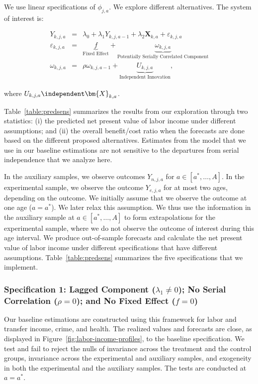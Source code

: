 We use linear specifications of $\phi_{j,a}$. We explore different alternatives. The system of interest is:

\begin{eqnarray}
Y_{k,j,a}                   &=& \lambda_{0} + \lambda_{1} Y_{k,j,a-1} + \lambda_{2}  \bm{X}_{k,a} + \varepsilon_{k,j,a} \nonumber \\
\varepsilon_{k,j,a} &=& \underbrace{f}_{\text{Fixed Effect}} + \underbrace{\omega_{k,j,a}}_{\text{Potentially Serially Correlated Component}} \nonumber \\
\omega_{k,j,a}      &=& \rho \omega_{k,j,a-1} + \underbrace{U_{k,j,a}}_{\text{Independent Innovation}},
\end{eqnarray}

\noindent where $U_{k,j,a} \independent \bm{X}_{k,a}$.

Table~\ref{table:predsens} summarizes the results from our exploration through two statistics: (i) the predicted net present value of labor income under different assumptions; and (ii) the overall benefit/cost ratio when the forecasts are done based on the different proposed alternatives. Estimates from the model that we use in our baseline estimations are not sensitive to the departures from serial independence that we analyze here.

In the auxiliary samples, we observe outcomes $Y_{n,j,a}$ for $a \in [a^*, \ldots, A]$. In the experimental sample, we observe the outcome $Y_{e,j,a}$ for at most two ages, depending on the outcome. We initially assume that we observe the outcome at one age ($a = a^*$). We later relax this assumption. We thus use the information in the auxiliary sample at  $a \in [a^*, \ldots, A]$ to form extrapolations for the experimental sample, where we do not observe the outcome of interest during this age interval. We produce out-of-sample forecasts and calculate the net present value of labor income under different specifications that have different assumptions. Table~\ref{table:predsens} summarizes the five specifications that we implement.

\subsubsection{Specification 1: Lagged Component ($\lambda_{1} \neq 0$); No Serial Correlation ($\rho = 0$); and No Fixed Effect ($f = 0$)} \label{app:spec1}

Our baseline estimations are constructed using this framework for labor and transfer income, crime, and health. The realized values and forecasts are close, as displayed in Figure~\ref{fig:labor-income-profiles}, to the baseline specification. We test and fail to reject the nulls of invariance across the treatment and the control groups, invariance across the experimental and auxiliary samples, and exogeneity in both the experimental and the auxiliary samples.  The tests are conducted at $a = a^*$.

